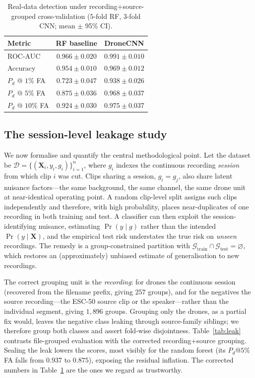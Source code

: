 \documentclass[11pt]{article}
\begin{document}
\begin{table}[h]\centering
\caption{Real-data detection under recording+source-grouped cross-validation
($5$-fold RF, $3$-fold CNN; mean $\pm$ 95\% CI).}
\label{tab:real}
\begin{tabular}{lcc}
\toprule
Metric & RF baseline & DroneCNN \\
\midrule
ROC-AUC        & $0.966\pm0.020$ & $\mathbf{0.991\pm0.010}$ \\
Accuracy       & $0.954\pm0.010$ & $\mathbf{0.969\pm0.012}$ \\
$P_d$ @ $1\%$ FA  & $0.723\pm0.047$ & $\mathbf{0.938\pm0.026}$ \\
$P_d$ @ $5\%$ FA  & $0.875\pm0.036$ & $\mathbf{0.968\pm0.037}$ \\
$P_d$ @ $10\%$ FA & $0.924\pm0.030$ & $\mathbf{0.975\pm0.037}$ \\
\bottomrule
\end{tabular}
\end{table}

\subsection{The session-level leakage study}
\label{subsec:leak}
We now formalise and quantify the central methodological point. Let the dataset
be $\mathcal{D}=\{(\mathbf{X}_i,y_i,g_i)\}_{i=1}^{n}$, where $g_i$ indexes the
continuous recording \emph{session} from which clip $i$ was cut. Clips sharing a
session, $g_i=g_j$, also share latent nuisance factors---the same background, the
same channel, the same drone unit at near-identical operating point. A random
clip-level split assigns such clips independently and therefore, with high
probability, places near-duplicates of one recording in both training and test.
A classifier can then exploit the session-identifying nuisance, estimating
$\Pr(y\mid g)$ rather than the intended $\Pr(y\mid \mathbf{X})$, and the empirical
test risk understates the true risk on \emph{unseen} recordings. The remedy is a
group-constrained partition with
$\mathcal{G}_{\mathrm{train}}\cap\mathcal{G}_{\mathrm{test}}=\varnothing$, which
restores an (approximately) unbiased estimate of generalisation to new recordings.

The correct grouping unit is the \emph{recording}: for drones the continuous
session (recovered from the filename prefix, giving $257$ groups), and for the
negatives the source recording---the ESC-50 source clip or the speaker---rather
than the individual segment, giving $1{,}896$ groups. Grouping only the drones,
as a partial fix would, leaves the negative class leaking through source-family
siblings; we therefore group both classes and assert fold-wise disjointness.
Table~\ref{tab:leak} contrasts file-grouped evaluation with the corrected
recording+source grouping. Sealing the leak lowers the scores, most visibly for
the random forest (its $P_d$@$5\%$FA falls from $0.937$ to $0.875$), exposing the
residual inflation. The corrected numbers in Table~\ref{tab:real} are the ones we
regard as trustworthy.
\end{document}
